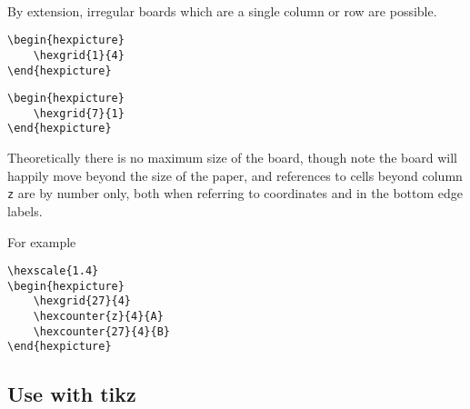 \documentclass[a4paper,12pt]{article}
\begin{document}
    \begin{hexpicture}
    \end{hexpicture}\\

    By extension, irregular boards which are a single column or row are possible.

    \begin{verbatim}\begin{hexpicture}
    \hexgrid{1}{4}
\end{hexpicture}\end{verbatim}

    \begin{hexpicture}
    \end{hexpicture}

    \begin{verbatim}\begin{hexpicture}
    \hexgrid{7}{1}
\end{hexpicture}\end{verbatim}

    \begin{hexpicture}
    \end{hexpicture}
    
    Theoretically there is no maximum size of the board, though note the board will happily move beyond the size of the paper, and references to cells beyond column \verb|z| are by number only, both when referring to coordinates and in the bottom edge labels.
    
    For example
    
    \begin{verbatim}\hexscale{1.4}
\begin{hexpicture}
    \hexgrid{27}{4}
    \hexcounter{z}{4}{A}
    \hexcounter{27}{4}{B}
\end{hexpicture}\end{verbatim}
    
    \begin{hexpicture}
    \end{hexpicture}
    
    
    \subsection{Use with tikz}
    
\end{document}
